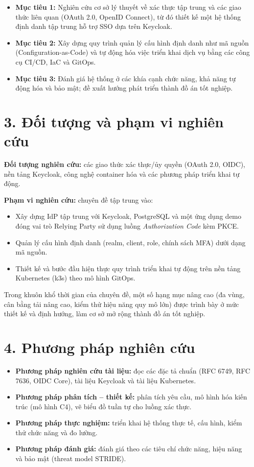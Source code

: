 \begin{itemize}
  \item \textbf{Mục tiêu 1:} Nghiên cứu cơ sở lý thuyết về xác thực tập trung
  và các giao thức liên quan (OAuth 2.0, OpenID Connect), từ đó thiết kế một
  hệ thống định danh tập trung hỗ trợ SSO dựa trên Keycloak.
  \item \textbf{Mục tiêu 2:} Xây dựng quy trình quản lý cấu hình định danh như mã nguồn (Configuration-as-Code) và tự động hóa việc triển khai
  dịch vụ bằng các công cụ CI/CD, IaC và GitOps.
  \item \textbf{Mục tiêu 3:} Đánh giá hệ thống ở các khía cạnh chức năng, khả
  năng tự động hóa và bảo mật; đề xuất hướng phát triển thành đồ án tốt nghiệp.
\end{itemize}

\section*{3. Đối tượng và phạm vi nghiên cứu}

\textbf{Đối tượng nghiên cứu:} các giao thức xác thực/ủy quyền (OAuth 2.0,
OIDC), nền tảng Keycloak, công nghệ container hóa và các phương pháp triển
khai tự động.

\textbf{Phạm vi nghiên cứu:} chuyên đề tập trung vào:
\begin{itemize}
  \item Xây dựng IdP tập trung với Keycloak, PostgreSQL và một ứng dụng demo
  đóng vai trò Relying Party sử dụng luồng \textit{Authorization Code} kèm
  PKCE.
  \item Quản lý cấu hình định danh (realm, client, role, chính sách MFA) dưới
  dạng mã nguồn.
  \item Thiết kế và bước đầu hiện thực quy trình triển khai tự động trên nền
  tảng Kubernetes (k3s) theo mô hình GitOps.
\end{itemize}

Trong khuôn khổ thời gian của chuyên đề, một số hạng mục nâng cao (đa vùng,
cân bằng tải nâng cao, kiểm thử hiệu năng quy mô lớn) được trình bày ở mức
thiết kế và định hướng, làm cơ sở mở rộng thành đồ án tốt nghiệp.

\section*{4. Phương pháp nghiên cứu}

\begin{itemize}
  \item \textbf{Phương pháp nghiên cứu tài liệu:} đọc các đặc tả chuẩn
  (RFC 6749, RFC 7636, OIDC Core), tài liệu Keycloak và tài liệu Kubernetes.
  \item \textbf{Phương pháp phân tích -- thiết kế:} phân tích yêu cầu, mô hình
  hóa kiến trúc (mô hình C4), vẽ biểu đồ tuần tự cho luồng xác thực.
  \item \textbf{Phương pháp thực nghiệm:} triển khai hệ thống thực tế, cấu
  hình, kiểm thử chức năng và đo lường.
  \item \textbf{Phương pháp đánh giá:} đánh giá theo các tiêu chí chức năng,
  hiệu năng và bảo mật (threat model STRIDE).
\end{itemize}

